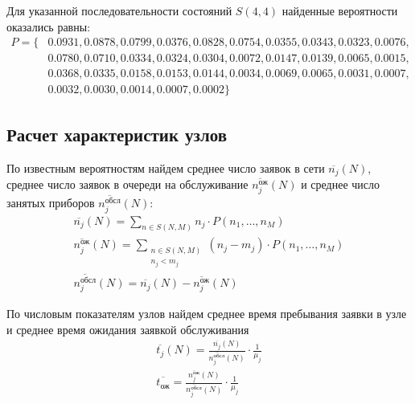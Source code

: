Для указанной последовательности состояний $S(4,4)$ найденные вероятности оказались равны:
\begin{displaymath}
\begin{split}
	P = \{ 
		&0.0931, 0.0878, 0.0799, 0.0376, 0.0828, 0.0754, 0.0355, 0.0343, 0.0323, 0.0076, \\
		&0.0780, 0.0710, 0.0334, 0.0324, 0.0304, 0.0072, 0.0147, 0.0139, 0.0065, 0.0015, \\
		&0.0368, 0.0335, 0.0158, 0.0153, 0.0144, 0.0034, 0.0069, 0.0065, 0.0031, 0.0007, \\
		&0.0032, 0.0030, 0.0014, 0.0007, 0.0002 \}
\end{split}
\end{displaymath}

\subsection{Расчет характеристик узлов}

По известным вероятностям найдем среднее число заявок в сети $\overline{n_j}(N)$, среднее число заявок в очереди на обслуживание $\overline{n_j^\text{ож}}(N)$ и среднее число занятых приборов $\overline{n_j^\text{обсл}}(N)$:
\begin{displaymath}
\begin{gathered}
	\overline{n_j}(N) = \sum \limits_{n \in S(N, M)} n_j \cdot P(n_1, \dots, n_M) \\
	\overline{n_j^\text{ож}}(N) = \sum \limits_{\substack{n \in S(N, M) \\ n_j < m_j}} (n_j - m_j) \cdot P(n_1, \dots, n_M) \\
	\overline{n_j^\text{обсл}}(N) = \overline{n_j}(N) - \overline{n_j^\text{ож}}(N)
\end{gathered}
\end{displaymath}

По числовым показателям узлов найдем среднее время пребывания заявки в узле и среднее время ожидания заявкой обслуживания 
\begin{displaymath}
\begin{gathered}
	\overline{t_j}(N) = \frac{\overline{n_j}(N)}{\overline{n_j^\text{обсл}}(N)} \cdot \frac{1}{\mu_j} \\
	\overline{t_\text{ож}} = \frac{\overline{n_j^\text{ож}}(N)}{\overline{n_j^\text{обсл}}(N)} \cdot \frac{1}{\mu_j}
\end{gathered}
\end{displaymath}

